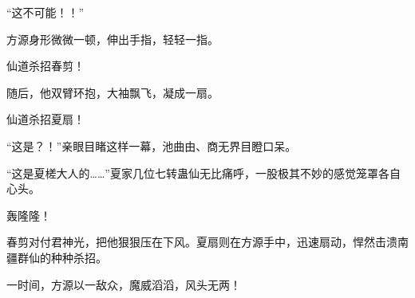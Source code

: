 \begin{this_body}
“这不可能！！”

方源身形微微一顿，伸出手指，轻轻一指。

仙道杀招春剪！

随后，他双臂环抱，大袖飘飞，凝成一扇。

仙道杀招夏扇！

“这是？！”亲眼目睹这样一幕，池曲由、商无界目瞪口呆。

“这是夏槎大人的……”夏家几位七转蛊仙无比痛呼，一股极其不妙的感觉笼罩各自心头。

轰隆隆！

春剪对付君神光，把他狠狠压在下风。夏扇则在方源手中，迅速扇动，悍然击溃南疆群仙的种种杀招。

一时间，方源以一敌众，魔威滔滔，风头无两！

\end{this_body}

